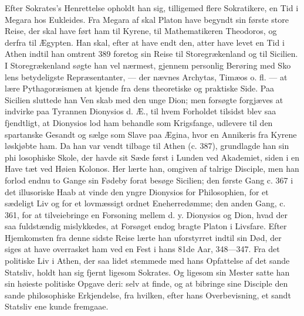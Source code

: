 \documentclass[12pt,a4paper]{book}
\begin{document}
Efter Sokrates's Henrettelse opholdt han sig, tilligemed
flere Sokratikere, en Tid i Megara hos Eukleides. Fra Megara
af skal Platon have begyndt sin første store Reise, der skal
have ført ham til Kyrene, til Mathematikeren Theodoros, og
derfra til Ægypten. Han skal, efter at have endt den, atter
have levet en Tid i Athen indtil han omtrent 389 foretog sin
Reise til Storegrækenland og til Sicilien. I Storegrækenland
søgte han vel nærmest, gjennem personlig Berøring med Sko\-%
lens betydeligste Repræsentanter, --- der nævnes Archytas,
Timæos o. fl. --- at lære Pythagoræismen at kjende fra dens
theoretiske og praktiske Side. Paa Sicilien sluttede han Ven\-%
skab med den unge Dion; men forsøgte forgjæves at indvirke
paa Tyrannen Dionysios d. Æ., til hvem Forholdet tilsidst blev
saa fjendtligt, at Dionysios lod ham behandle som Krigsfange,
udlevere til den spartanske Gesandt og sælge som Slave paa
Ægina, hvor en Annikeris fra Kyrene løskjøbte ham. Da han
var vendt tilbage til Athen (c. 387), grundlagde han sin phi\-%
losophiske Skole, der havde sit Sæde først i Lunden ved
Akademiet, siden i en Have tæt ved Høien Kolonos. Her
lærte han, omgiven af talrige Disciple, men han forlod endnu
to Gange sin Fødeby forat besøge Sicilien; den første Gang
c. 367 i det illusoriske Haab at vinde den yngre Dionysios for
Philosophien, for et sædeligt Liv og for et lovmæssigt ordnet
Eneherredømme; den anden Gang, c. 361, for at tilveiebringe
en Forsoning mellem d. y. Dionysios og Dion, hvad der saa
fuldstændig mislykkedes, at Forsøget endog bragte Platon i
Livsfare. Efter Hjemkomsten fra denne sidste Reise lærte han
uforstyrret indtil sin Død, der siges at have overrasket ham
ved en Fest i hans 81de Aar, 348---347. Fra det politiske
Liv i Athen, der saa lidet stemmede med hans Opfattelse af
det sande Statsliv, holdt han sig fjernt ligesom Sokrates. Og
ligesom sin Mester satte han sin høieste politiske Opgave deri:
selv at finde, og at bibringe sine Disciple den sande philosophiske
Erkjendelse, fra hvilken, efter hans Overbevisning, et sandt
Statsliv ene kunde fremgaae.
\end{document}
